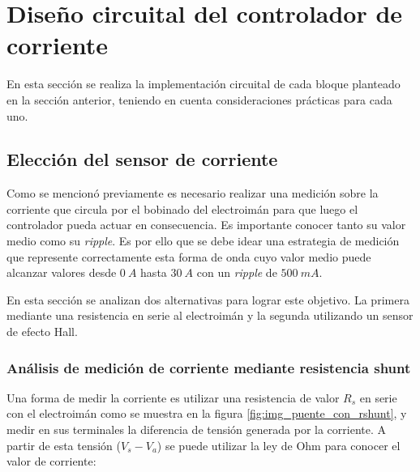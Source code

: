 %
%
\section{Diseño circuital del controlador de corriente}

En esta sección se realiza la implementación circuital de cada bloque planteado en la sección anterior, teniendo en cuenta consideraciones prácticas para cada uno.


\subsection{Elección del sensor de corriente}

Como se mencionó previamente es necesario realizar una medición sobre la corriente que circula por el bobinado del electroimán para que luego el controlador pueda actuar en consecuencia. Es importante conocer tanto su valor medio como su \textsl{ripple}. Es por ello que se debe idear una estrategia de medición que represente correctamente esta forma de onda cuyo valor medio puede alcanzar valores desde $0\:A$ hasta $30\:A$ con un \textsl{ripple} de $500\:mA$.

En esta sección se analizan dos alternativas para lograr este objetivo. La primera mediante una resistencia en serie al electroimán y la segunda utilizando un sensor de efecto Hall.


\subsubsection{Análisis de medición de corriente mediante resistencia shunt}

Una forma de medir la corriente es utilizar una resistencia de valor $R_s$ en serie con el electroimán como se muestra en la figura \ref{fig:img_puente_con_rshunt}, y medir en sus terminales la diferencia de tensión generada por la corriente. A partir de esta tensión ($V_s-V_a$) se puede utilizar la ley de Ohm para conocer el valor de corriente:

